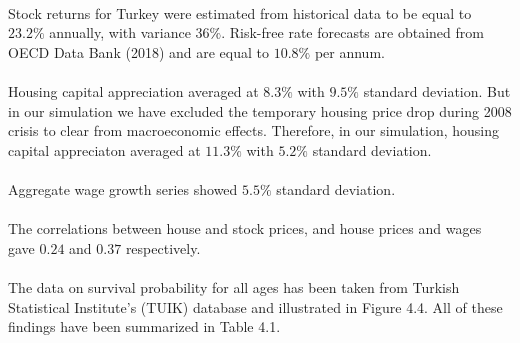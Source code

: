 \paragraph{}Stock returns for Turkey were estimated from historical data to be equal to $23.2\%$ annually, with variance $36\%$. Risk-free rate forecasts are obtained from OECD Data Bank (2018) and are equal to $10.8\%$ per annum.

\paragraph{}Housing capital appreciation averaged at $8.3\%$ with $9.5\%$ standard deviation. But in our simulation we have excluded the temporary housing price drop during 2008 crisis to clear from macroeconomic effects. Therefore, in our simulation, housing capital appreciaton averaged at $11.3\%$ with $5.2\%$ standard deviation.

\paragraph{}Aggregate wage growth series showed $5.5\%$ standard deviation.

\paragraph{}The correlations between house and stock prices, and house prices and wages gave $0.24$ and $0.37$ respectively.

\paragraph{}The data on survival probability for all ages has been taken from Turkish Statistical Institute's (TUIK) database and illustrated in Figure 4.4. All of these findings have been summarized in Table 4.1. 

